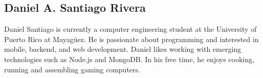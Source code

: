 \subsection{Daniel A. Santiago Rivera}

Daniel Santiago is currently a computer engineering student at the University of
Puerto Rico at Mayagüez. He is passionate about programming and interested in
mobile, backend, and web development. Daniel likes working with emerging
technologies such as Node.js and MongoDB. In his free time, he enjoys cooking,
running and assembling gaming computers.
